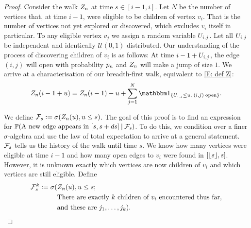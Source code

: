 \begin{proof} \label{P: formula an}
	Consider the walk $Z_n$ at time $s\in[i-1, i]$.
	Let $N$ be the number of vertices that, at time $i-1$, were eligible to be children of vertex $v_i$.
	That is the number of vertices not yet explored or discovered, which excludes $v_i$ itself in particular.
	To any eligible vertex $v_j$ we assign a random variable $U_{i,j}$.
	Let all $U_{i,j}$ be independent and identically $\mathcal{U}(0,1)$ distributed.
	Our understanding of the process of discovering children of $v_i$ is as follows:
	At time $i-1+U_{i,j}$, the edge $(i,j)$ will open with probability $p_n$ and
	$Z_n$ will make a jump of size $1$.
	We arrive at a characterisation of our breadth-first walk, 
	equivalent to \eqref{E: def Z}:	
	\begin{equation}
	\Zn(i-1+u) = \Zn(i-1) - u + \sum_{j=1}^{N} \Ind{\{\Uij \leq u, \; (i,j) \; \text{open}\}}.
	\end{equation}
	
	We define $\mathcal{F}_s := \sigma(Z_n(u), u\leq s)$.
	The goal of this proof is to find an expression for
	$\mathbb{P}(\text{A new edge appears in $[s, s+ds]$} \: | \: \mathcal{F}_s)$.
	To do this, we condition over a finer $\sigma$-algebra and use the law of total expectation to arrive at a general statement.
	$\mathcal{F}_s$ tells us the history of the walk until time $s$. 
	We know how many vertices were eligible at time $i-1$ and how many open edges to $v_i$ were found in $[\lfloor s\rfloor,s]$.
	However, it is unknown exactly which vertices are now children of $v_i$ and which vertices are still eligible.
	Define 
	\begin{equation}
	\begin{split}
	\mathcal{F}_s^k := \sigma(&Z_n(u), u\leq s; \\
	&\text{There are exactly $k$ children of $v_i$ encountered thus far}, \\
	&\text{and these are $j_1, \dots, j_k$}).
	\end{split}
	\end{equation}
	

\end{proof}
